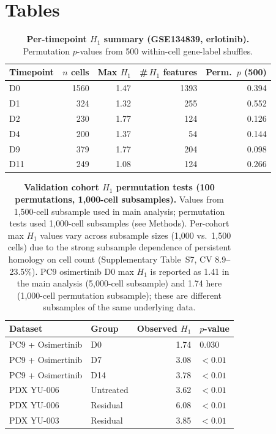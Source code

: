 \clearpage
\section*{Tables}

\begin{table}
  \caption{\textbf{Per-timepoint $H_1$ summary (GSE134839, erlotinib).}
  Permutation $p$-values from 500 within-cell gene-label shuffles.}
  \label{tab:per_timepoint}
  \centering
  \begin{tabular}{l r r r r}
    \toprule
    Timepoint & $n$ cells & Max $H_1$ & \#\,$H_1$ features & Perm.\ $p$ (500) \\
    \midrule
    D0  & 1560 & 1.47 & 1393 & 0.394 \\
    D1  &  324 & 1.32 &  255 & 0.552 \\
    D2  &  230 & 1.77 &  124 & 0.126 \\
    D4  &  200 & 1.37 &   54 & 0.144 \\
    D9  &  379 & 1.77 &  204 & 0.098 \\
    D11 &  249 & 1.08 &  124 & 0.266 \\
    \bottomrule
  \end{tabular}
\end{table}

\begin{table}
  \caption{\textbf{Validation cohort $H_1$ permutation tests
  (100 permutations, 1{,}000-cell subsamples).} Values from 1{,}500-cell
  subsample used in main analysis; permutation tests used 1{,}000-cell
  subsamples (see Methods). Per-cohort max $H_1$ values vary across
  subsample sizes (1{,}000 vs.\ 1{,}500 cells) due to the strong
  subsample dependence of persistent homology on cell count
  (Supplementary Table~S7, CV 8.9--23.5\%). PC9 osimertinib D0 max
  $H_1$ is reported as 1.41 in the main analysis (5{,}000-cell
  subsample) and 1.74 here (1{,}000-cell permutation subsample);
  these are different subsamples of the same underlying data.}
  \label{tab:validation}
  \centering
  \begin{tabular}{l l r l}
    \toprule
    Dataset & Group & Observed $H_1$ & $p$-value \\
    \midrule
    PC9 + Osimertinib & D0        & 1.74 & 0.030 \\
    PC9 + Osimertinib & D7        & 3.08 & $< 0.01$ \\
    PC9 + Osimertinib & D14       & 3.78 & $< 0.01$ \\
    PDX YU-006        & Untreated & 3.62 & $< 0.01$ \\
    PDX YU-006        & Residual  & 6.08 & $< 0.01$ \\
    PDX YU-003        & Residual  & 3.85 & $< 0.01$ \\
    \bottomrule
  \end{tabular}
\end{table}

